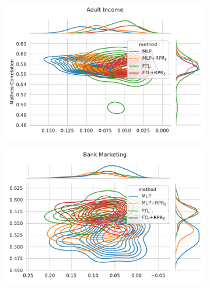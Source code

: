 \begin{figure}
\centering
\caption{Metric distribution optimizing MCC and Equalized Odds in comparison with Redlining Penalty Regularization across multiple resample runs. Corresponding values available at Table~\ref{tab:complete_mcc_odds_rpr}.}
\label{fig:complete_mcc_odds_rpr}
\begin{subfigure}{.45\linewidth}
    \includegraphics[width=1\linewidth]{images/pareto_mcc_odds_adult_rpr.pdf}
\end{subfigure}
\begin{subfigure}{.45\linewidth}
    \includegraphics[width=1\linewidth]{images/pareto_mcc_odds_bank_rpr.pdf}
\end{subfigure}


\end{figure}
